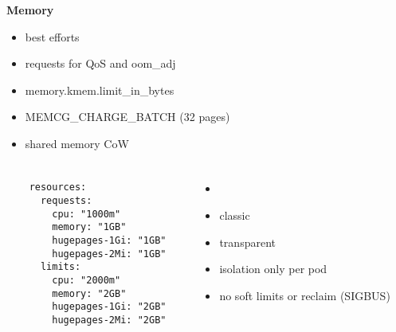 \documentclass[usenames,dvipsnames, 18pt, compress, aspectratio=169]{beamer}
\begin{document}
\begin{frame}
    \frametitle{}
    \begin{center}
    \textbf{Memory}

        \begin{itemize}[label={\MVRightarrow}]
            \item best efforts
            \item requests for QoS and oom\_adj
            \item memory.kmem.limit\_in\_bytes
            \item MEMCG\_CHARGE\_BATCH (32 pages)
            \item shared memory CoW
        \end{itemize}

    \end{center}
\end{frame}

\begin{frame}[fragile]{}
    \frametitle{}
    \begin{columns}
        \begin{column}{0.48\columnwidth}
        \begin{verbatim}
    resources:
      requests:
        cpu: "1000m"
        memory: "1GB"
        hugepages-1Gi: "1GB"
        hugepages-2Mi: "1GB"
      limits:
        cpu: "2000m"
        memory: "2GB"
        hugepages-1Gi: "2GB"
        hugepages-2Mi: "2GB"
        \end{verbatim}
        \end{column}

        \begin{column}{0.48\columnwidth}
            \vspace*{-2.5em}
            \begin{center}
                \begin{itemize}
                    \item <+->
                \end{itemize}

                \begin{itemize}[label={\MVRightarrow}]
                    \item<+-> classic
                    \item<+-> transparent
                    \item<+-> isolation only per pod
                    \item<+-> no soft limits or reclaim (SIGBUS)
                \end{itemize}
            \end{center}
        \end{column}

    \end{columns}
\end{frame}
\end{document}

